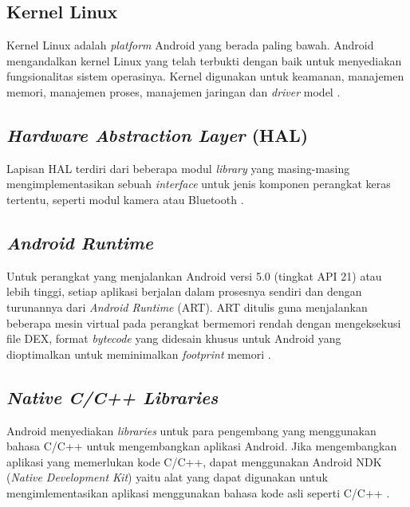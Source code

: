 \subsection{Kernel Linux}
Kernel Linux adalah \textit{platform} Android yang berada paling bawah. Android mengandalkan kernel Linux yang telah terbukti dengan baik untuk menyediakan fungsionalitas sistem operasinya. Kernel digunakan untuk keamanan, manajemen memori, manajemen proses, manajemen jaringan dan \textit{driver} model \citep{android2017}.

\subsection{\textit{Hardware Abstraction Layer} (HAL)}
Lapisan HAL terdiri dari beberapa modul \textit{library} yang masing-masing mengimplementasikan sebuah \textit{interface} untuk jenis komponen perangkat keras tertentu, seperti modul kamera atau Bluetooth \citep{android2017}.

\subsection{\textit{Android Runtime}}
Untuk perangkat yang menjalankan Android versi 5.0 (tingkat API 21) atau lebih tinggi, setiap aplikasi berjalan dalam prosesnya sendiri dan dengan turunannya dari \textit{Android Runtime} (ART). ART ditulis guna menjalankan beberapa mesin virtual pada perangkat bermemori rendah dengan mengeksekusi file DEX, format \textit{bytecode} yang didesain khusus untuk Android yang dioptimalkan untuk meminimalkan \textit{footprint} memori \citep{android2017}. 

\subsection{\textit{Native C/C++ Libraries}}
Android menyediakan \textit{libraries} untuk para pengembang yang menggunakan bahasa C/C++ untuk mengembangkan aplikasi Android. Jika mengembangkan aplikasi yang memerlukan kode C/C++, dapat menggunakan Android NDK (\textit{Native Development Kit}) yaitu alat yang dapat digunakan untuk mengimlementasikan aplikasi menggunakan bahasa kode asli seperti C/C++ \citep{android2017}.


